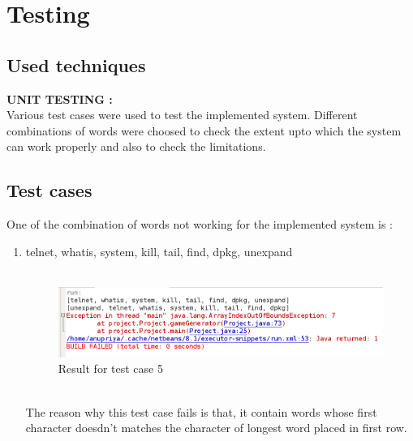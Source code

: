 \chapter{Testing}

\section{Used techniques}
\vspace*{3 ex}
\textbf{UNIT TESTING :}\\

Various test cases were used to test the implemented system. Different combinations of words were choosed to check the extent upto which the system can work properly and also to check the limitations.


\section{Test cases}
One of the combination of words not working for the implemented system is :\\
\begin{enumerate}
\item telnet, whatis, system, kill, tail, find, dpkg, unexpand\\ \\


\begin{figure}[!ht]
\centering
\includegraphics[scale=0.4]{test.png}
\caption{\label{img} Result for test case 5}
\end{figure}

\\
The reason why this test case fails is that, it contain words whose first character doesdn't matches the character of longest word placed in first row. 

\end{enumerate}


